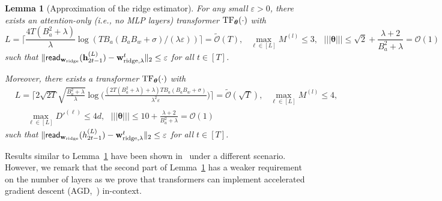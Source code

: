 \documentclass[10pt]{article}
\newtheorem{lemma}[theorem]{Lemma}
\newcommand{\eps}{\varepsilon}
\renewcommand{\cO}{\mathcal{O}}
\newcommand{\<}{\left\langle}
\renewcommand{\>}{\right\rangle}
\newcommand{\lth}{{(\ell)}}
\newcommand{\TF}{{\rm TF}}
\renewcommand{\read}{{\sf read}}
\newcommand{\ridge}{{\rm ridge}}
\newcommand{\nrmp}[1]{{\left|\!\left|\!\left|{#1}\right|\!\right|\!\right|}}
\newcommand{\tcO}{{\tilde{\mathcal O}}}
\newcommand{\hidden}{{D'}}
\def\btheta{{\boldsymbol \theta}}
\def\bh{{\mathbf h}}
\def\bw{{\mathbf w}}
\begin{document}
\begin{lemma}[Approximation of the ridge estimator]\label{lm:approx_ridge}
For any small $\eps>0$, there exists an attention-only (i.e., no MLP layers) transformer $\TF_\btheta(\cdot)$ with
$$L=\Big\lceil\frac{4T(B_a^2+\lambda)}{\lambda}\log({TB_a(B_aB_w+\sigma)}/({\lambda}\eps))\Big\rceil=\tcO(T),~~~\max_{\ell\in[L]}M^{(l)}\leq3,~~~ \nrmp{\btheta}\leq  \sqrt{2}+\frac{\lambda+2}{B_a^2+\lambda}=\cO(1)$$ such that $\|\read_{\bw_{\ridge}}(\bh_{2t-1}^{(L)})-\bw^t_{\ridge,\lambda}\|_2\leq\eps$ for all $t\in[T]$.

Moreover, there exists a  transformer $\TF_\btheta(\cdot)$ with  \begin{align*}&L=\Big\lceil2\sqrt{2T}\sqrt{\frac{B_a^2+\lambda}{\lambda}}\log\Big(\frac{(2T(B_a^2+\lambda)+\lambda)TB_a(B_aB_w+\sigma)}{\lambda^2\eps}\Big)\Big\rceil=\tcO(\sqrt{T}),~~~\max_{\ell\in[L]}M^{(l)}\leq4,~~~ \\
&~~~~~~\max_{\ell\in[L]}\hidden^{\lth}\leq 4d,~~~\nrmp{\btheta}\leq  10+\frac{\lambda+2}{B_a^2+\lambda}=\cO(1) \end{align*}
 such that $\|\read_{\bw_{\ridge}}(h_{2t-1}^{(L)})-\bw^t_{\ridge,\lambda}\|_2\leq\eps$ for all $t\in[T]$.
\end{lemma}



Results similar to Lemma~\ref{lm:approx_ridge} have been shown in~\cite{bai2023transformers} under a different scenario.   However, we remark that  the second part of Lemma~\ref{lm:approx_ridge} has a weaker requirement on the number of layers as we prove that transformers can implement accelerated gradient descent (AGD,~\cite{nesterov2003introductory}) in-context.
\end{document}

